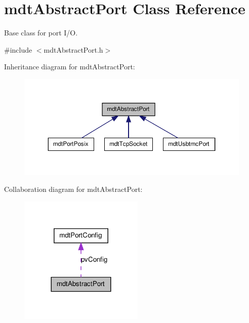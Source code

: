 \hypertarget{classmdt_abstract_port}{
\section{mdtAbstractPort Class Reference}
\label{classmdt_abstract_port}
}


Base class for port I/O.  




{\ttfamily \#include $<$mdtAbstractPort.h$>$}



Inheritance diagram for mdtAbstractPort:\nopagebreak
\begin{figure}[H]
\begin{center}
\leavevmode
\includegraphics[width=358pt]{classmdt_abstract_port__inherit__graph}
\end{center}
\end{figure}


Collaboration diagram for mdtAbstractPort:\nopagebreak
\begin{figure}[H]
\begin{center}
\leavevmode
\includegraphics[width=168pt]{classmdt_abstract_port__coll__graph}
\end{center}
\end{figure}
